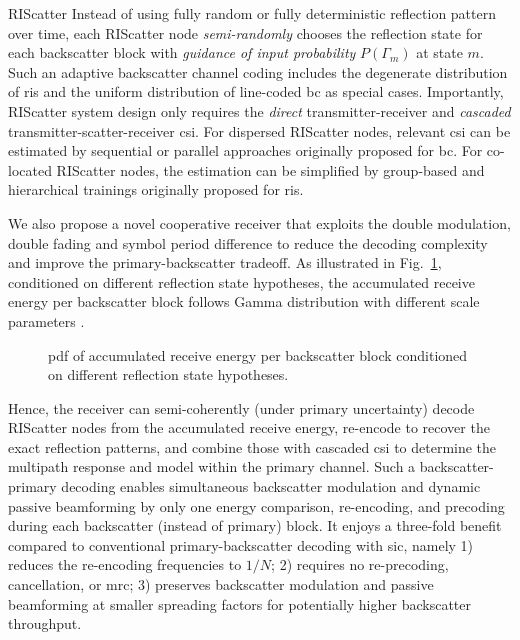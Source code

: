 \documentclass[journal,12pt,onecolumn,draftclsnofoot]{IEEEtran}
\theoremstyle{remark}
\begin{document}
\begin{section}{RIScatter}
	Instead of using fully random or fully deterministic reflection pattern over time, each RIScatter node \emph{semi-randomly} chooses the reflection state for each backscatter block with \emph{guidance of input probability} $P(\Gamma_m)$ at state $m$.
	Such an adaptive backscatter channel coding includes the degenerate distribution of \gls{ris} and the uniform distribution of line-coded \gls{bc} as special cases.
	Importantly, RIScatter system design only requires the \emph{direct} transmitter-receiver and \emph{cascaded} transmitter-scatter-receiver \gls{csi}.
	For dispersed RIScatter nodes, relevant \gls{csi} can be estimated by sequential \cite{Bharadia2015,Yang2015b,Guo2019g} or parallel approaches \cite{Jin2021a} originally proposed for \gls{bc}.
	For co-located RIScatter nodes, the estimation can be simplified by group-based \cite{Zheng2019} and hierarchical \cite{You2019} trainings originally proposed for \gls{ris}.

	We also propose a novel cooperative receiver that exploits the double modulation, double fading and symbol period difference to reduce the decoding complexity and improve the primary-backscatter tradeoff.
	As illustrated in Fig.~\ref{fg:energy_distribution}, conditioned on different reflection state hypotheses, the accumulated receive energy per backscatter block follows Gamma distribution with different scale parameters \cite{Qian2017b}.
	\begin{figure}[!t]
		\centering
		\resizebox{0.4\columnwidth}{!}{
			
		}
		\caption{
			\gls{pdf} of accumulated receive energy per backscatter block conditioned on different reflection state hypotheses.
		}
		\label{fg:energy_distribution}
	\end{figure}
	Hence, the receiver can semi-coherently (under primary uncertainty) decode RIScatter nodes from the accumulated receive energy, re-encode to recover the exact reflection patterns, and combine those with cascaded \gls{csi} to determine the multipath response and model within the primary channel.
	Such a backscatter-primary decoding enables simultaneous backscatter modulation and dynamic passive beamforming by only one energy comparison, re-encoding, and precoding during each backscatter (instead of primary) block.
	It enjoys a three-fold benefit compared to conventional primary-backscatter decoding with \gls{sic}, namely
	1) reduces the re-encoding frequencies to $1/N$;
	2) requires no re-precoding, cancellation, or \gls{mrc};
	3) preserves backscatter modulation and passive beamforming at smaller spreading factors for potentially higher backscatter throughput.



\end{section}
\end{document}
